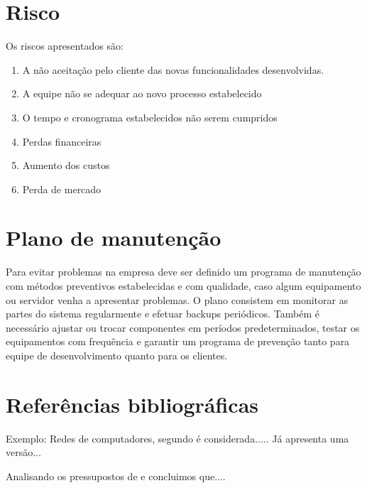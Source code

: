 \documentclass[	DIV=calc,%
							paper=a4,%
							fontsize=12pt,%
							onecolumn]{scrartcl}	 					%
\begin{document}
\section{Risco}
Os riscos apresentados são:

\begin{enumerate}
	\item A não aceitação pelo cliente das novas funcionalidades desenvolvidas.
	\item A equipe não se adequar ao novo processo estabelecido
	\item O tempo e cronograma estabelecidos não serem cumpridos
	\item Perdas financeiras
	\item Aumento dos custos
	\item Perda de mercado
\end{enumerate}

\section{Plano de manutenção}
Para evitar problemas na empresa deve ser definido um programa de manutenção com métodos preventivos estabelecidas e com qualidade, caso algum equipamento ou servidor venha a apresentar problemas. 
O plano consistem em monitorar as partes do sistema regularmente e efetuar backups periódicos. Também é necessário ajustar ou trocar componentes em períodos predeterminados, testar os equipamentos com frequência e garantir um programa de prevenção tanto para equipe de desenvolvimento quanto para os clientes.

\section{Referências bibliográficas}

Exemplo: Redes de computadores, segundo \cite{t2013} é considerada..... Já \cite{kurose2010} apresenta uma versão...

Analisando os pressupostos de \cite{ref3} e \cite{ref4} concluimos que....


\renewcommand\refname{} %

  
\end{document}
